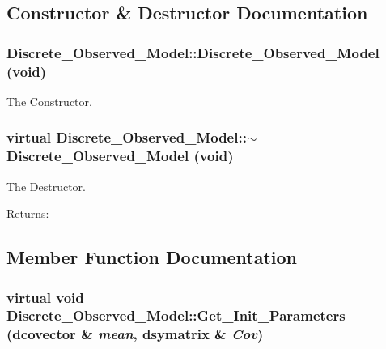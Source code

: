 \subsection{Constructor \& Destructor Documentation}
\hypertarget{class_discrete___observed___model_919fa5f92fc705c4b2b3b7c94c0517ef}{
\subsubsection[{Discrete\_\-Observed\_\-Model}]{\setlength{\rightskip}{0pt plus 5cm}Discrete\_\-Observed\_\-Model::Discrete\_\-Observed\_\-Model (void)}}
\label{class_discrete___observed___model_919fa5f92fc705c4b2b3b7c94c0517ef}


The Constructor. 

\hypertarget{class_discrete___observed___model_8439d77622a8479eded60eeb51fcb5c6}{
\subsubsection[{$\sim$Discrete\_\-Observed\_\-Model}]{\setlength{\rightskip}{0pt plus 5cm}virtual Discrete\_\-Observed\_\-Model::$\sim$Discrete\_\-Observed\_\-Model (void)}}
\label{class_discrete___observed___model_8439d77622a8479eded60eeb51fcb5c6}


The Destructor. 

\begin{Desc}
\item[Returns:]\end{Desc}


\subsection{Member Function Documentation}
\hypertarget{class_discrete___observed___model_e10c283d482bdb9257ad87a9cf5e6898}{
\subsubsection[{Get\_\-Init\_\-Parameters}]{\setlength{\rightskip}{0pt plus 5cm}virtual void Discrete\_\-Observed\_\-Model::Get\_\-Init\_\-Parameters (dcovector \& {\em mean}, \/  dsymatrix \& {\em Cov})}}
\label{class_discrete___observed___model_e10c283d482bdb9257ad87a9cf5e6898}


